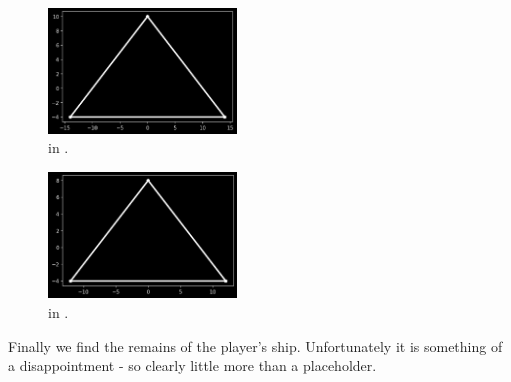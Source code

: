\begin{minipage}[c]{0.48\linewidth}
\begin{figure}[H]
    \centering
    \begin{adjustbox}{width=5.5cm,center}
        \includegraphics[width=5cm]{src/recreation/FORT3.png}%
    \end{adjustbox}
  \caption*{ in .}
\end{figure}
\end{minipage}
\begin{minipage}[c]{0.48\linewidth}
\begin{figure}[H]
    \centering
    \begin{adjustbox}{width=5.5cm,center}
        \includegraphics[width=5cm]{src/recreation/FORT4.png}%
    \end{adjustbox}
  \caption*{ in .}
\end{figure}
\end{minipage}

Finally we find the remains of the player's ship. Unfortunately it is something of a disappointment - so clearly little
more than a placeholder.

